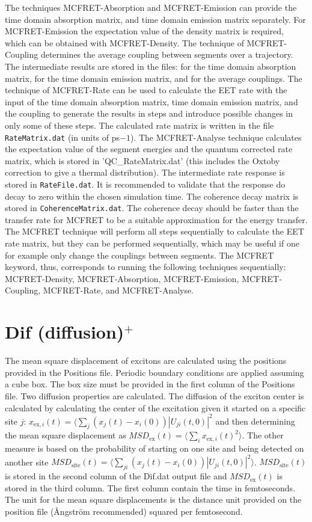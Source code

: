The techniques MCFRET-Absorption and MCFRET-Emission can provide the time domain absorption matrix, and time domain emission matrix separately.
For MCFRET-Emission the expectation value of the density matrix is required, which can be obtained with MCFRET-Density.
The technique of MCFRET-Coupling determines the average coupling between segments over a trajectory. The intermediate results are stored in the files:
  for the time domain absorption matrix,  for the time domain emission matrix, and   for the average couplings. 
The technique of MCFRET-Rate can be used to calculate the EET rate with the input of the time domain absorption matrix, time domain emission matrix, and the coupling to generate the results in steps and introduce possible changes in only some of these steps.  The calculated rate matrix is written in the file {\tt RateMatrix.dat} (in units of ps${-1}$). The MCFRET-Analyse technique calculates the expectation value of the segment energies and the quantum corrected rate matrix, which is stored in 'QC\_RateMatrix.dat' (this includes the Oxtoby correction to give a thermal distribution). The intermediate  rate response is stored in {\tt RateFile.dat}. It is recommended to validate that the response do decay to zero within the chosen simulation time. The coherence decay matrix is stored in {\tt CoherenceMatrix.dat}. The coherence decay should be faster than the transfer rate for MCFRET to be a suitable approximation for the energy transfer.
The MCFRET technique will perform all steps sequentially to calculate the EET rate matrix, but they can be performed sequentially, which may be useful if one for example only change the couplings between segments. 
The MCFRET keyword, thus, corresponds to running the following techniques sequentially: MCFRET-Density, MCFRET-Absorption, MCFRET-Emission, MCFRET-Coupling, MCFRET-Rate, and MCFRET-Analyse.

\section{Dif (diffusion)$^{+}$}
The mean square displacement of excitons are calculated using the positions provided in the Positions file. Periodic boundary conditions are applied assuming a cube box. The box size must be provided in the first column of the Positions file.
Two diffusion properties are calculated. The diffusion of the exciton center is calculated by calculating the center of the excitation given it started on a specific site $j$: $x_{\textrm{ex},i}(t)=\langle \sum_j (x_j(t)-x_i(0)) |U_{ji}(t,0)|^2$ and then determining the mean square displacement as $MSD_{\textrm{ex}}(t)=\langle \sum_i  x_{\textrm{ex},i}(t)^2\rangle$. The other measure is based on the probability of starting on one site and being detected on another site $MSD_{\textrm{site}}(t)=\langle \sum_{ji} (x_j(t)-x_i(0))|U_{ji}(t,0)|^2\rangle$. $MSD_{\textrm{site}}(t)$ is stored in the second column of the Dif.dat output file and $MSD_{\textrm{ex}}(t)$ is stored in the third column. The first column contain the time in femtoseconds. The unit for the mean square displacements is the distance unit provided on the position file (\AA ngstr\"{o}m recommended) squared per femtosecond. 
